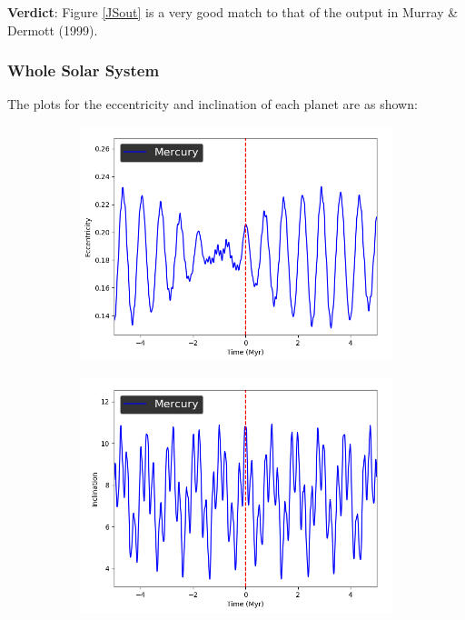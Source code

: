 \documentclass[11pt, oneside]{article}   	%
\begin{document}
\textbf{Verdict}: Figure \ref{JSout} is a very good match to that of the output in Murray \& Dermott (1999)\cite{ssd}.

\subsubsection{Whole Solar System}

The plots for the eccentricity and inclination of each planet are as shown:
\begin{figure}[!h]
    \centering
    \begin{subfigure}[t]{0.49\textwidth}
    \captionsetup{width=0.9\textwidth}
	\centering
       	 \includegraphics[width=\textwidth]{Eccentricity_Mercury}
    \end{subfigure}
    \begin{subfigure}[t]{0.49\textwidth}
    \captionsetup{width=0.9\textwidth}
        	\centering
	\includegraphics[width=\textwidth]{Inclination_Mercury}
    \end{subfigure}
\end{figure}
\end{document}

